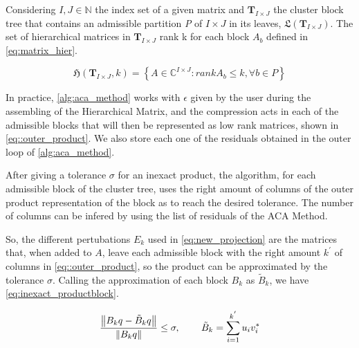 Considering $I,J \in \mathbb{N}$ the index set of a given matrix and $\mathbf{T}_{I \times J}$ the cluster block tree that contains an admissible partition \textit{P} of $ I \times J$ in its leaves, $\mathfrak{L}(\mathbf{T}_{I \times J})$. The set of hierarchical matrices in $\mathbf{T}_{I \times J}$ rank k for each block $A_{b}$ defined in \ref{eq:matrix_hier}.

\begin{equation}\label{eq:matrix_hier}
    \mathfrak{H}(\mathbf{T}_{I \times J},k) = \left\{  A\in \mathbb{C}^{I\times J} : rankA_{b} \leq k, \forall b \in P \right\}
\end{equation}


In practice, \ref{alg:aca_method} works with $\epsilon$ given by the user during the assembling of the Hierarchical Matrix, and the compression acts in each of the admissible blocks that will then be represented as low rank matrices, shown in \ref{eq::outer_product}. We also store each one of the residuals obtained in the outer loop of \ref{alg:aca_method}. 

After giving a tolerance $\sigma$ for an inexact product, the algorithm, for each admissible block of the cluster tree, uses the right amount of columns of the outer product representation of the block as to reach the desired tolerance. The number of columns can be infered by using the list of residuals of the ACA Method.

So, the different pertubations $E_{k}$ used in \ref{eq:new_projection} are the matrices that, when added to $A$, leave each admissible block with the right amount $k^{'}$ of columns in \ref{eq::outer_product}, so the product can be approximated by the tolerance $\sigma$. Calling the approximation of each block $B_{k}$ as $\tilde{B}_{k}$, we have \ref{eq:inexact_productblock}.

\begin{equation}\label{eq:inexact_productblock}
    \frac{\left\lVert B_{k}q - \tilde{B}_{k}q \right\rVert}{\left\lVert B_{k}q\right\rVert} \leq \sigma, \hspace{0.3in} \tilde{B}_{k} = \sum_{i=1} ^{k^{'}} u_{i} v_{i} ^{*}
\end{equation}



